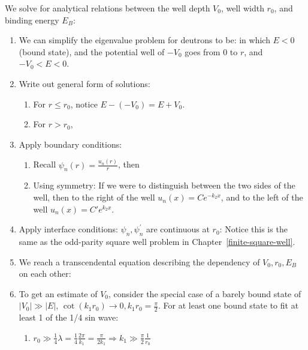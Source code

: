 \documentclass{school-22.101-notes}
\begin{document}
We solve for analytical relations between the well depth $V_0$, well width $r_0$, and binding energy $E_B$: 
\begin{enumerate}
\item We can simplify the eigenvalue problem for deutrons to be:
in which $E<0$ (bound state), and the potential well of $-V_0$ goes from $0$ to $r$, and $-V_0 < E < 0$. 

\item Write out general form of solutions:  
\begin{enumerate}
\item For $r \le r_0$, notice $E - (-V_0) = E + V_0$. 

\item For $r > r_0$, 
\end{enumerate}

\item Apply boundary conditions:
\begin{enumerate}
\item Recall $\psi_n (r) = \frac{u_n(r)}{r}$, then 

\item Using symmetry:
If we were to distinguish between the two sides of the well, then to the right of the well $u_n(x) = C e^{-k_2 x}$, and to the left of the well $u_n (x) = C' e^{k_2 x}$. 
\end{enumerate}

\item Apply interface conditions: $\psi_n, \psi^{\prime}_n$ are continuous at $r_0$: 
Notice this is the same as the odd-parity square well problem in Chapter~\ref{finite-square-well}. 


\item We reach a transcendental equation describing the dependency of $V_0, r_0, E_B$ on each other:

\item To get an estimate of $V_0$, consider the special case of a barely bound state of $|V_0| \gg |E|$, $\cot (k_1 r_0) \to 0, k_1 r_0 = \frac{\pi}{2}$. For at least one bound state to fit at least 1 of the 1/4 sin wave: 
\begin{enumerate}
\item $ r_0 \gg \frac{1}{4}\lambda = \frac{1}{4}\frac{2 \pi}{k_1}  = \frac{\pi}{2k_1}  \Rightarrow k_1 \gg \frac{\pi}{2} \frac{1}{r_0} $


\end{enumerate}
\end{enumerate}
\end{document}
